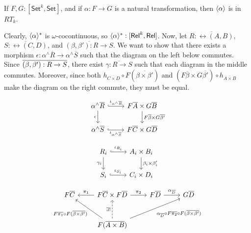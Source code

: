 \documentclass{lmcs}
\theoremstyle{plain}\newtheorem{satz}[thm]{Satz}
\newcommand{\set}{\mathsf{Set}}
\begin{document}
\begin{lem}\label{lem:graph-reln-functors}
If $F,G : [\set^k,\set]$, and if $\alpha : F \to G$ is a natural
transformation, then $\langle {\alpha} \rangle$ is in $RT_k$.
\end{lem}
\proof
Clearly, $\langle {\alpha} \rangle^*$ is $\omega$-cocontinuous, so
$\langle {\alpha} \rangle^* : [\mathsf{Rel}^k,\mathsf{Rel}]$. Now, let $\overline{R :
  \rel(A, B)}$, $\overline{S : \rel(C, D)}$, and $\overline{(\beta,
  \beta') : R \to S}$. We want to show that there exists a morphism
$\epsilon : \alpha^\wedge\overline{R} \to \alpha^\wedge\overline{S}$
such that the diagram on the left below commutes. Since
$\overline{(\beta,\beta') : R \to S}$, there exist $\overline{\gamma : R \to
  S}$ such that each diagram in the middle commutes.
Moreover, since both $h_{\overline{C \times D}} \circ
F(\overline{\beta \times \beta'})$ and $(F\overline{\beta} \times
G\overline{\beta'}) \circ h_{\overline{A \times B}}$ make the diagram
on the right commute, they must be equal.
  \begin{minipage}[b]{0.25\linewidth}
 {\small    \[
    \begin{tikzcd}
        \alpha^\wedge\overline{R}
        \ar[r, hookrightarrow, "{\iota_{\alpha^\wedge\overline{R}}}"]
        \ar[d, "{\epsilon}"']
        & F\overline{A} \times G\overline{B}
        \ar[d, "{F\overline{\beta} \times G\overline{\beta'}}"] \\
        \alpha^\wedge\overline{S}
        \ar[r, hookrightarrow, "{\iota_{\alpha^\wedge\overline{S}}}"']
        & F\overline{C} \times G\overline{D}
    \end{tikzcd}
    \]}
\end{minipage}
\begin{minipage}[b]{0.25\linewidth}
{\small    \[
    \begin{tikzcd}
        R_i
        \ar[d, "{\gamma_i}"']
        \ar[r, hookrightarrow, "{\iota_{R_i}}"]
        &A_i \times B_i
        \ar[d, "{\beta_i \times \beta'_i}"] \\
        S_i
        \ar[r, hookrightarrow, "{\iota_{S_i}}"]
        &C_i \times D_i
    \end{tikzcd}
    \]}
\end{minipage}
\begin{minipage}[b]{0.25\linewidth}
{\footnotesize \[
      \begin{tikzcd}[row sep = large]
          F\overline{C}
          &F\overline{C} \times F\overline{D}
          \ar[l, "{\pi_1}"'] \ar[r, "{\pi_2}"]
          &F\overline{D}
          \ar[r, "{\alpha_{\ol{D}}}"]
          &G\overline{D}\\
          &F(\overline{A \times B})
          \ar[u, dashed, "{\exists !}"]
          \ar[ul, "{F\ol{\pi_1} \circ F(\overline{\beta \times \beta'})}"]
          \ar[urr, "{\alpha_{\ol{D}} \circ F\ol{\pi_2} \circ F(\overline{\beta \times \beta'})}"']
      \end{tikzcd}
      \]}
\end{minipage}
\end{document}
